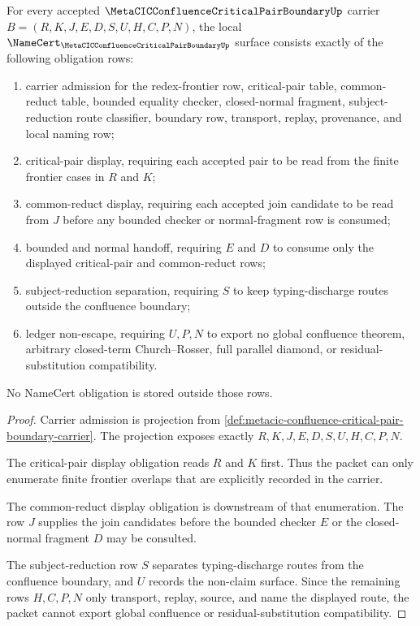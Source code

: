 \begin{theorem}
\label{thm:metacic-confluence-critical-pair-boundary-obligations}
For every accepted $\MetaCICConfluenceCriticalPairBoundaryUp$ carrier
$B=(R,K,J,E,D,S,U,H,C,P,N)$, the local
$\NameCert_{\MetaCICConfluenceCriticalPairBoundaryUp}$ surface consists
exactly of the following obligation rows:
\begin{enumerate}
\item carrier admission for the redex-frontier row, critical-pair table,
common-reduct table, bounded equality checker, closed-normal fragment,
subject-reduction route classifier, boundary row, transport, replay,
provenance, and local naming row;
\item critical-pair display, requiring each accepted pair to be read from the
finite frontier cases in $R$ and $K$;
\item common-reduct display, requiring each accepted join candidate to be read
from $J$ before any bounded checker or normal-fragment row is consumed;
\item bounded and normal handoff, requiring $E$ and $D$ to consume only the
displayed critical-pair and common-reduct rows;
\item subject-reduction separation, requiring $S$ to keep typing-discharge
routes outside the confluence boundary;
\item ledger non-escape, requiring $U,P,N$ to export no global confluence
theorem, arbitrary closed-term Church--Rosser, full parallel diamond, or
residual-substitution compatibility.
\end{enumerate}
No NameCert obligation is stored outside those rows.
\end{theorem}
\begin{proof}
Carrier admission is projection from
\autoref{def:metacic-confluence-critical-pair-boundary-carrier}. The projection
exposes exactly $R,K,J,E,D,S,U,H,C,P,N$.

The critical-pair display obligation reads $R$ and $K$ first. Thus the packet
can only enumerate finite frontier overlaps that are explicitly recorded in
the carrier.

The common-reduct display obligation is downstream of that enumeration. The
row $J$ supplies the join candidates before the bounded checker $E$ or the
closed-normal fragment $D$ may be consulted.

The subject-reduction row $S$ separates typing-discharge routes from the
confluence boundary, and $U$ records the non-claim surface. Since the remaining
rows $H,C,P,N$ only transport, replay, source, and name the displayed route,
the packet cannot export global confluence or residual-substitution
compatibility.
\end{proof}

